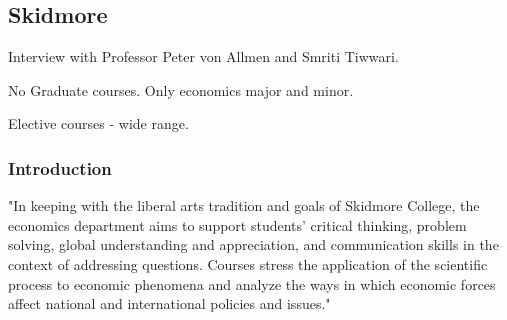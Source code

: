 \documentclass[12pt]{article}
\theoremstyle{plain}
\theoremstyle{plain}
\theoremstyle{plain}
\theoremstyle{plain}
\theoremstyle{plain}
\theoremstyle{plain}
\begin{document}
\subsection{Skidmore}
\label{sec:orga551b2d}
Interview with Professor Peter von Allmen and Smriti Tiwwari.

No Graduate courses.
Only economics major and minor.

Elective courses - wide range.

\subsubsection{Introduction}
\label{sec:orgc7ba002}
"In keeping with the liberal arts tradition and goals of Skidmore College,
the economics department aims to support students' critical thinking,
problem solving, global understanding and appreciation,
and communication skills in the context of addressing questions.
Courses stress the application of the scientific process to economic phenomena and
analyze the ways in which economic forces affect national and international policies and issues."
\end{document}
